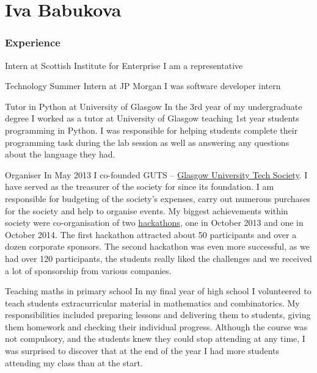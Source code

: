 \documentclass{tccv}
\begin{document}
\setlength{\emergencystretch}{3em}
\part{Iva Babukova}

\section{Experience}

\begin{skillist}

\item{Intern at Scottish Institute for Enterprise}
{I am a representative}

\item{Technology Summer Intern at JP Morgan}
{I was software developer intern }

\item{Tutor in Python at University of Glasgow} {In the 3rd year of my undergraduate degree I worked as a tutor at University of Glasgow teaching 1st year students programming in Python. I was responsible for helping students complete their programming task during the lab session as well as answering any questions about the language they had.}

\item{Organiser} {In May 2013 I co-founded GUTS -- \href{http://gutechsoc.com}{Glasgow University Tech Society}. I have served as the treasurer of the society for since its foundation. I am responsible for budgeting of the society's expenses, carry out numerous purchases for the society and help to organise events. My biggest achievements within society were co-organisation of two \href{http://storify.com/Eventhread/gu-hackaton}{hackathons}, one in October 2013 and one in October 2014. The first hackathon attracted about 50 participants and over a dozen corporate sponsors. The second hackathon was even more successful, as we had over 120 participants, the students really liked the challenges and we received a lot of sponsorship from various companies.}


\item{Teaching maths in primary school} {In my final year of high school I volunteered to teach students extracurricular material in mathematics and combinatorics. My responsibilities included preparing lessons and delivering them to students, giving them homework and checking their individual progress. Although the course was not compulsory, and the students knew they could stop attending at any time, I was surprised to discover that at the end of the year I had more students attending my class than at the start.}



\end{skillist}
\end{document}
